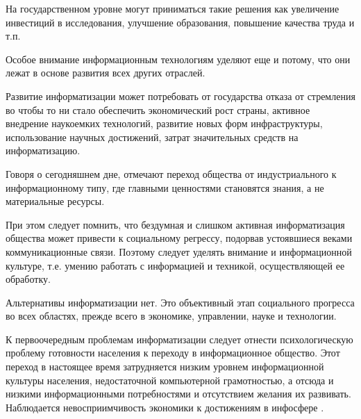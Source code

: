 На государственном уровне могут приниматься такие решения как увеличение инвестиций в исследования, улучшение образования, повышение качества труда и т.п.

Особое внимание информационным технологиям уделяют еще и потому, что они лежат в основе развития всех других отраслей.

Развитие информатизации может потребовать от государства отказа от стремления во чтобы то ни стало обеспечить экономический рост страны, активное внедрение наукоемких технологий, развитие новых форм инфраструктуры, использование научных достижений, затрат значительных средств на информатизацию.

Говоря о сегодняшнем дне, отмечают переход общества от индустриального к информационному типу, где главными ценностями становятся знания, а не материальные ресурсы.

При этом следует помнить, что бездумная и слишком активная информатизация общества может привести к социальному регрессу, подорвав устоявшиеся веками коммуникационные связи. Поэтому следует уделять внимание и информационной культуре, т.е. умению работать с информацией и техникой, осуществляющей ее обработку.

Альтернативы информатизации нет. Это объективный этап социального прогресса во всех областях, прежде всего в экономике, управлении, науке и технологии.

К первоочередным проблемам информатизации следует отнести психологическую проблему готовности населения к переходу в информационное общество. Этот переход в настоящее время затрудняется низким уровнем информационной культуры населения, недостаточной компьютерной грамотностью, а отсюда и низкими информационными потребностями и отсутствием желания их развивать. Наблюдается невосприимчивость экономики к достижениям в инфосфере \cite{bib215}.




\clearpage